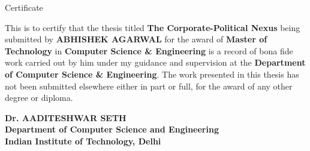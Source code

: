 \begin{center}
\LARGE{ Certificate}
\end{center}

\vspace{0.5in}

This is to certify that the thesis titled {\bfseries The Corporate-Political Nexus} being submitted by
{\bfseries ABHISHEK AGARWAL} for the award of {\bfseries Master of Technology} in {\bfseries Computer Science \& Engineering} is a record of bona fide work carried out by him under my guidance and supervision at the {\bfseries Department of Computer Science \& Engineering}. The work presented in this thesis has not been submitted elsewhere either in part or full, for the award of any other degree or diploma.

\vspace{1.5in}


{\bfseries Dr. AADITESHWAR SETH} \\
{\bfseries Department of Computer Science and Engineering} \\
{\bfseries Indian Institute of Technology, Delhi}\\
